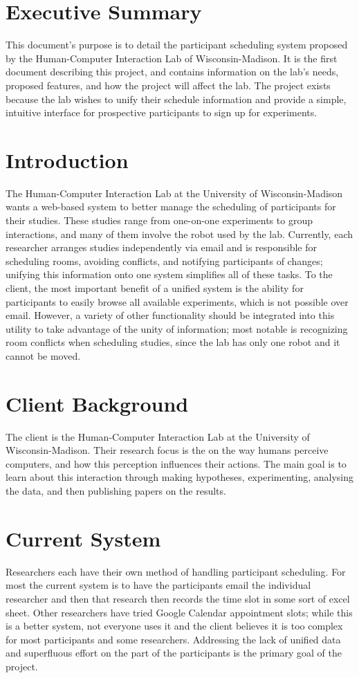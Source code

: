 \tableofcontents
\newpage

\section{Executive Summary}
This document's purpose is to detail the participant scheduling system proposed by the Human-Computer Interaction Lab of Wisconsin-Madison. It is the first document describing this project, and contains information on the lab's needs, proposed features, and how the project will affect the lab.  The project exists because the lab wishes to unify their schedule information and provide a simple, intuitive interface for prospective participants to sign up for experiments.

\section{Introduction}
The Human-Computer Interaction Lab at the University of Wisconsin-Madison wants a web-based system to better manage the scheduling of participants for their studies.  These studies range from one-on-one experiments to group interactions, and many of them involve the robot used by the lab.  Currently, each researcher arranges studies independently via email and is responsible for scheduling rooms, avoiding conflicts, and notifying participants of changes; unifying this information onto one system simplifies all of these tasks.  To the client, the most important benefit of a unified system is the ability for participants to easily browse all available experiments, which is not possible over email.  However, a variety of other functionality should be integrated into this utility to take advantage of the unity of information; most notable is recognizing room conflicts when scheduling studies, since the lab has only one robot and it cannot be moved.

\section{Client Background}
The client is the Human-Computer Interaction Lab at the University of Wisconsin-Madison. Their research focus is the on the way humans perceive computers, and how this perception influences their actions. The main goal is to learn about this interaction through making hypotheses, experimenting, analysing the data, and then publishing papers on the results.

\section{Current System}
Researchers each have their own method of handling participant scheduling. For most the current system is to have the participants email the individual researcher and then that research then records the time slot in some sort of excel sheet. Other researchers have tried Google Calendar appointment slots; while this is a better system, not everyone uses it and the client believes it is too complex for most participants and some researchers.  Addressing the lack of unified data and superfluous effort on the part of the participants is the primary goal of the project.

